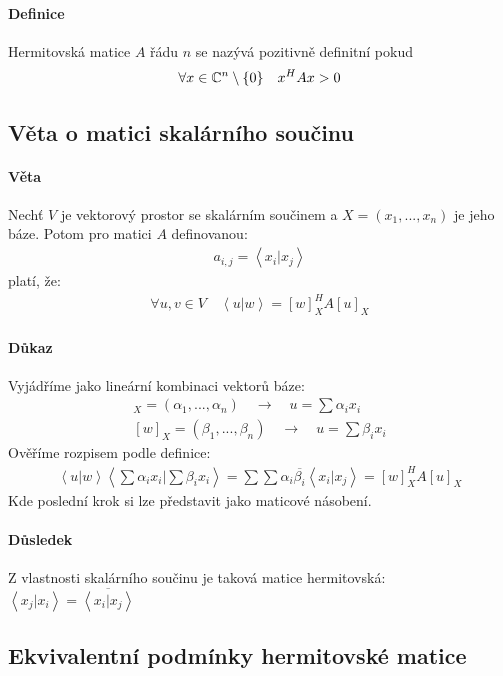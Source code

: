 \documentclass[a4paper,10pt]{article}
\begin{document}
\paragraph{Definice}
Hermitovská matice $A$ řádu $n$ se nazývá pozitivně definitní pokud 
\begin{align*}
	\forall x \in \mathbb{C}^n \setminus \{ 0 \} \quad x^H A x > 0
	\end{align*}


\subsection{Věta o matici skalárního součinu}
\setcounter{equation}{0}
\paragraph{Věta}
Nechť $V$ je vektorový prostor se skalárním součinem a $X = (x_1, ..., x_n)$ je
jeho báze. Potom pro matici $A$ definovanou:
\begin{align*}
	a_{i,j} = \left< x_i | x_j \right> 
\end{align*}
platí, že:
\begin{align*}
	\forall u,v \in V \quad \left< u|w \right> = [w]_X^H A [u]_X
\end{align*}
\paragraph{Důkaz}
Vyjádříme jako lineární kombinaci vektorů báze:
\begin{align}
	[u]_X = (\alpha_1, ..., \alpha_n) \quad \to \quad u = \sum \alpha_i x_i \\
	[w]_X = (\beta_1, ..., \beta_n) \quad \to \quad u = \sum \beta_i x_i
\end{align}
Ověříme rozpisem podle definice:
\begin{align}
	\left< u | w \right> \left< \sum \alpha_i x_i \Big| \sum \beta_i x_i \right>
	= \sum \sum \alpha_i \overline{\beta_i} \left< x_i | x_j \right> = [w]_X^H A
	[u]_X
\end{align}
Kde poslední krok si lze představit jako maticové násobení.
\paragraph{Důsledek}
Z vlastnosti skalárního součinu je taková matice hermitovská:
$\left<x_j|x_i\right> = \overline{\left<x_i | x_j\right>}$

\subsection{Ekvivalentní podmínky hermitovské matice}
\setcounter{equation}{0}
\end{document}
